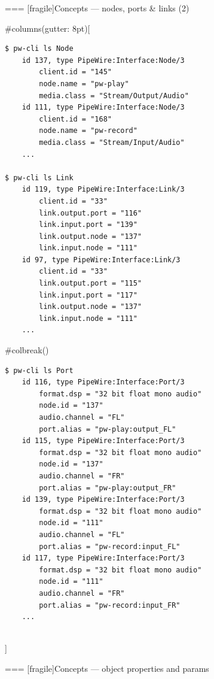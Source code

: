 === [fragile]{Concepts — nodes, ports \& links (2)}

  
#columns(gutter: 8pt)[
      \begin{block}{}
        \fontsize{8}{8}\selectfont
          \begin{verbatim}
$ pw-cli ls Node
    id 137, type PipeWire:Interface:Node/3
        client.id = "145"
        node.name = "pw-play"
        media.class = "Stream/Output/Audio"
    id 111, type PipeWire:Interface:Node/3
        client.id = "168"
        node.name = "pw-record"
        media.class = "Stream/Input/Audio"
    ...

$ pw-cli ls Link
    id 119, type PipeWire:Interface:Link/3
        client.id = "33"
        link.output.port = "116"
        link.input.port = "139"
        link.output.node = "137"
        link.input.node = "111"
    id 97, type PipeWire:Interface:Link/3
        client.id = "33"
        link.output.port = "115"
        link.input.port = "117"
        link.output.node = "137"
        link.input.node = "111"
    ...
          \end{verbatim}
        \end{block}


     #colbreak()
      \begin{block}{}
        \fontsize{8}{8}\selectfont
          \begin{verbatim}
$ pw-cli ls Port
    id 116, type PipeWire:Interface:Port/3
        format.dsp = "32 bit float mono audio"
        node.id = "137"
        audio.channel = "FL"
        port.alias = "pw-play:output_FL"
    id 115, type PipeWire:Interface:Port/3
        format.dsp = "32 bit float mono audio"
        node.id = "137"
        audio.channel = "FR"
        port.alias = "pw-play:output_FR"
    id 139, type PipeWire:Interface:Port/3
        format.dsp = "32 bit float mono audio"
        node.id = "111"
        audio.channel = "FL"
        port.alias = "pw-record:input_FL"
    id 117, type PipeWire:Interface:Port/3
        format.dsp = "32 bit float mono audio"
        node.id = "111"
        audio.channel = "FR"
        port.alias = "pw-record:input_FR"
    ...
          \end{verbatim}
        \end{block}

  \\]




=== [fragile]{Concepts — object properties and params}
  
